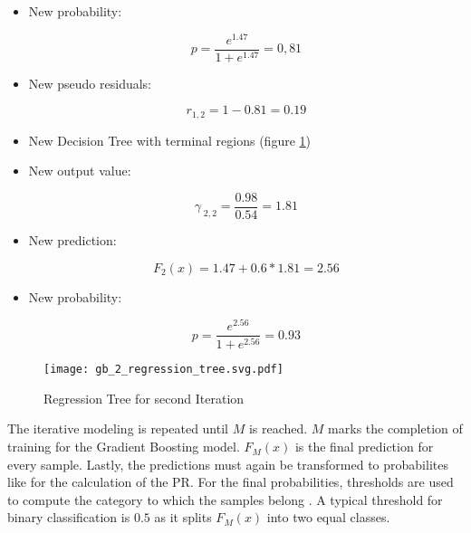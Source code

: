 \begin{itemize}

    \item New probability:

    \begin{equation*}
        p = \frac{e^{1.47}}{1 + e^{1.47}} = 0,81
    \end{equation*}

    \item New pseudo residuals: 

    \begin{equation*}
        r_{1, 2} = 1 - 0.81 = 0.19
    \end{equation*}
    
    \item New Decision Tree with terminal regions (figure \ref{fig:gb_2_regression_tree})

    \item New output value: 

    \begin{equation*}
        \gamma_{\;2,2} = \frac{0.98}{0.54} = 1.81 
    \end{equation*}

    \item New prediction:

    \begin{equation*}
        F_{2}(x) = 1.47 + 0.6 * 1.81 = 2.56
    \end{equation*}

    \item New probability:

    \begin{equation*}
        p = \frac{e^{2.56}}{1 + e^{2.56}} = 0.93 
    \end{equation*}

\end{itemize}

\begin{figure}[H]
    \centering
    \caption[]{Regression Tree for second Iteration}
    \label{fig:gb_2_regression_tree}
    \texttt{[image: gb\_2\_regression\_tree.svg.pdf]}
\end{figure}

The iterative modeling is repeated until \(M\) is reached. \(M\) marks the completion of training for the Gradient 
Boosting model. \(F_{M}(x)\) is the final prediction for every sample. Lastly, the predictions
must again be transformed to probabilites like for the calculation of the \ac{PR}. For the final probabilities, 
thresholds are used to compute the category to which the samples belong \cite[p.1204]{Friedman_2001}. A typical threshold 
for binary classification is \(0.5\) as it splits \(F_{M}(x)\) into two equal classes.

